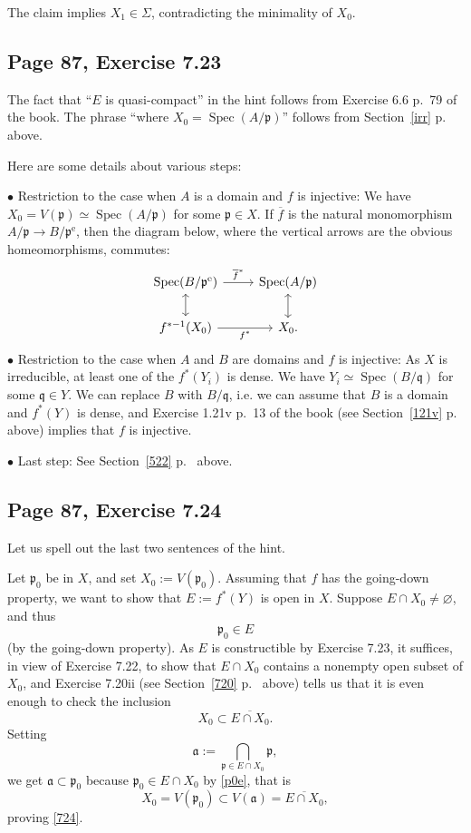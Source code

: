 \documentclass[parskip=half,fontsize=12pt]{scrartcl}%
\newcommand{\oo}{\operatorname}\newcommand{\ooo}{\operatorname*}
\newcommand{\mf}{\mathfrak}
\newcommand{\aaa}{\mf a}
\newcommand{\ppp}{\mf p}
\newcommand{\qqq}{\mf q}
\newcommand{\bu}{\bullet}
\newcommand{\Spec}{\operatorname{Spec}}\newcommand{\Sp}{\operatorname{Spec}}
\begin{document}
The claim implies $X_1\in\Sigma$, contradicting the minimality of $X_0$.

\subsection{Page 87, Exercise 7.23}%

The fact that ``$E$ is quasi-compact'' in the hint follows from Exercise 6.6 p.~79 of the book. The phrase ``where $X_0=\Spec(A/\ppp)$'' follows from Section~\ref{irr} p.~\pageref{irr} above. %

Here are some details about various steps:

$\bu$ Restriction to the case when $A$ is a domain and $f$ is injective: We have $X_0=V(\ppp)\simeq\Spec(A/\ppp)$ for some $\ppp\in X$. If $\overline f$ is the natural monomorphism $A/\ppp\to B/\ppp^{\oo e}$, then the diagram below, where the vertical arrows are the obvious homeomorphisms, commutes: 
$$
\begin{tikzcd}
\Spec(B/\ppp^{\oo e})\ar[r,"\overline f^*"]\ar[d,leftrightarrow]&\Spec(A/\ppp)\ar[d,leftrightarrow]\\ 
f^{*-1}(X_0)\ar[r,"f^*"']&X_0.
\end{tikzcd}
$$ 
$\bu$ Restriction to the case when $A$ and $B$ are domains and $f$ is injective: As $X$ is irreducible, at least one of the $f^*(Y_i)$ is dense. We have $Y_i\simeq\Spec(B/\qqq)$ for some $\qqq\in Y$. We can replace $B$ with $B/\qqq$, i.e. we can assume that $B$ is a domain and $f^*(Y)$ is dense, and Exercise 1.21v p.~13 of the book (see Section~\ref{121v} p.~\pageref{121v} above) implies that $f$ is injective. 

$\bu$ Last step: See Section~\ref{522} p.~\pageref{522} above.

\subsection{Page 87, Exercise 7.24}%

Let us spell out the last two sentences of the hint.

Let $\ppp_0$ be in $X$, and set $X_0:=V(\ppp_0)$. Assuming that $f$ has the going-down property, we want to show that $E:=f^*(Y)$ is open in $X$. Suppose $E\cap X_0\ne\varnothing$, and thus 
\begin{equation}\label{p0e}
\ppp_0\in E
\end{equation} 
(by the going-down property). As $E$ is constructible by Exercise 7.23, it suffices, in view of Exercise 7.22, to show that $E\cap X_0$ contains a nonempty open subset of $X_0$, and Exercise 7.20ii (see Section~\ref{720} p.~\pageref{720} above) tells us that it is even enough to check the inclusion 
\begin{equation}\label{724}
X_0\subset\overline{E\cap X_0}.
\end{equation} 
Setting 
$$
\aaa:=\bigcap_{\ppp\in E\cap X_0}\ppp,
$$ 
we get $\aaa\subset\ppp_0$ because $\ppp_0\in E\cap X_0$ by \eqref{p0e}, that is 
$$
X_0=V(\ppp_0)\subset V(\aaa)=\overline{E\cap X_0},
$$ 
proving \eqref{724}.
\end{document}
